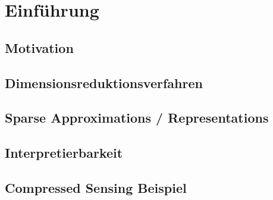 \chapter{Einführung}

\cite{elad}
\cite{foucart}
\cite{hastie_elements}
\cite{gribonval}
\cite{jenatton}
\cite{johnstone}
\cite{yata}
\cite{mairal}
\cite{tibshirani_lasso}
\cite{tibshirani_uniqueness}
\cite{zou_elasticnet}
\cite{zou_sparsepca}
\cite{zou_overview}
\cite{efron_lars}

\label{introduction}

\section{Motivation}

\section{Dimensionsreduktionsverfahren}

\section{Sparse Approximations / Representations}

\section{Interpretierbarkeit}

\section{Compressed Sensing Beispiel}